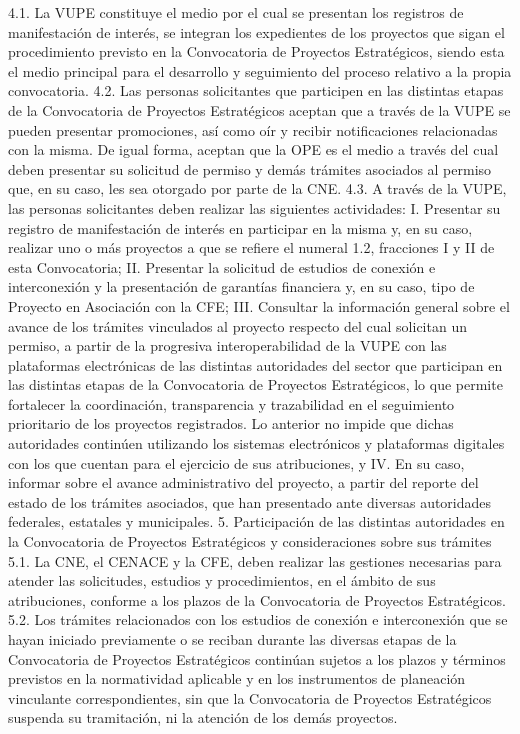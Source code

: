 4.1. La VUPE constituye el medio por el cual se presentan los registros de manifestación de interés, se integran los expedientes de los proyectos que sigan el procedimiento previsto en la Convocatoria de Proyectos Estratégicos, siendo esta el medio principal para el desarrollo y seguimiento del proceso relativo a la propia convocatoria.
4.2. Las personas solicitantes que participen en las distintas etapas de la Convocatoria de Proyectos Estratégicos aceptan que a través de la VUPE se pueden presentar promociones, así como oír y recibir notificaciones relacionadas con la misma. De igual forma, aceptan que la OPE es el medio a través del cual deben presentar su solicitud de permiso y demás trámites asociados al permiso que, en su caso, les sea otorgado por parte de la CNE.
4.3. A través de la VUPE, las personas solicitantes deben realizar las siguientes actividades:
I. Presentar su registro de manifestación de interés en participar en la misma y, en su caso, realizar uno o más proyectos a que se refiere el numeral 1.2, fracciones I y II de esta Convocatoria;
II. Presentar la solicitud de estudios de conexión e interconexión y la presentación de garantías financiera y, en su caso, tipo de Proyecto en Asociación con la CFE;
III. Consultar la información general sobre el avance de los trámites vinculados al proyecto respecto del cual solicitan un permiso, a partir de la progresiva interoperabilidad de la VUPE con las plataformas electrónicas de las distintas autoridades del sector que participan en las distintas etapas de la Convocatoria de Proyectos Estratégicos, lo que permite fortalecer la coordinación, transparencia y trazabilidad en el seguimiento prioritario de los proyectos registrados. Lo anterior no impide que dichas autoridades continúen utilizando los sistemas electrónicos y plataformas digitales con los que cuentan para el ejercicio de sus atribuciones, y
IV. En su caso, informar sobre el avance administrativo del proyecto, a partir del reporte del estado de los trámites asociados, que han presentado ante diversas autoridades federales, estatales y municipales.
5. Participación de las distintas autoridades en la Convocatoria de Proyectos Estratégicos y consideraciones sobre sus trámites
5.1. La CNE, el CENACE y la CFE, deben realizar las gestiones necesarias para atender las solicitudes, estudios y procedimientos, en el ámbito de sus atribuciones, conforme a los plazos de la Convocatoria de Proyectos Estratégicos.
5.2. Los trámites relacionados con los estudios de conexión e interconexión que se hayan iniciado previamente o se reciban durante las diversas etapas de la Convocatoria de Proyectos Estratégicos continúan sujetos a los plazos y términos previstos en la normatividad aplicable y en los instrumentos de planeación vinculante correspondientes, sin que la Convocatoria de Proyectos Estratégicos suspenda su tramitación, ni la atención de los demás proyectos.
